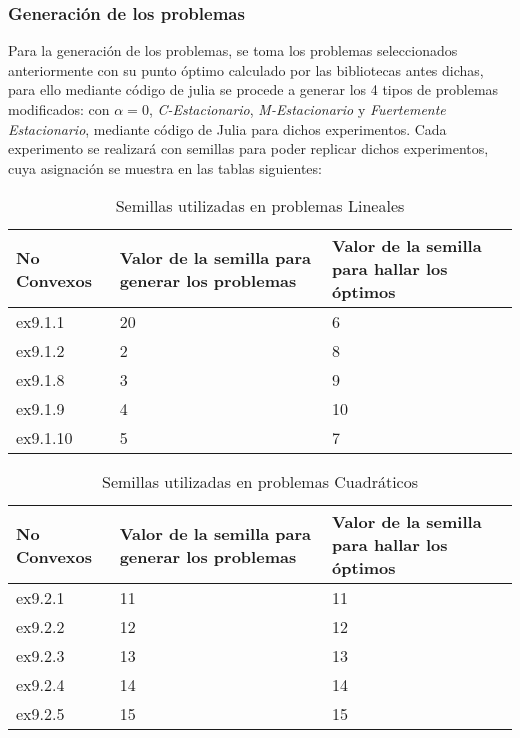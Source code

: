 \subsubsection{Generación de los problemas}
Para la generación de los problemas, se toma los problemas seleccionados anteriormente con su punto óptimo calculado por las bibliotecas antes dichas, para ello mediante código de julia se procede a generar los 4 tipos de problemas modificados: con \textit{$\alpha =0 $}, \textit{C-Estacionario}, \textit{M-Estacionario} y \textit{Fuertemente Estacionario}, mediante 
código de Julia para dichos experimentos. Cada experimento se realizará con semillas para poder replicar dichos experimentos, cuya asignación se muestra en las tablas siguientes:



\begin{table}[h!]
\centering
\caption{Semillas utilizadas en problemas Lineales}
\begin{tabular}{ | m{5cm} | m{5cm} | m{5cm} | }
  
  \hline
  \textbf{No Convexos} & \textbf{Valor de la semilla para generar los problemas}  & \textbf{Valor de la semilla para hallar los óptimos} \\
  \hline
 ex9.1.1 & 20 & 6 \\
  \hline
 ex9.1.2 & 2 & 8\\
  \hline
   ex9.1.8 & 3& 9 \\
  \hline
  ex9.1.9 & 4 & 10\\
  \hline
 ex9.1.10 & 5 & 7 \\
  \hline
\end{tabular}
\end{table}


\begin{table}[h!]
    \centering
    \caption{Semillas utilizadas en problemas Cuadráticos}
    \begin{tabular}{ | m{5cm} | m{5cm} | m{5cm} | }
      
      \hline
      \textbf{No Convexos} & \textbf{Valor de la semilla para generar los problemas}  & \textbf{Valor de la semilla para hallar los óptimos} \\
      \hline
      ex9.2.1 & 11 &11 \\
      \hline
      ex9.2.2 & 12 &12 \\
      \hline
      ex9.2.3 & 13 &13\\
      \hline
      ex9.2.4 & 14 &14\\
      \hline
      ex9.2.5 & 15 &15\\
      \hline
    \end{tabular}
    \end{table}

